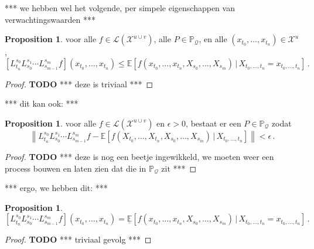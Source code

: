 \documentclass[10pt]{paper}
\theoremstyle{definition}
\newtheorem{proposition}[theorem]{Proposition}
\newcommand{\states}{\mathcal{X}}
\newcommand{\processes}{\mathbb{P}}
\newcommand{\gambles}{\mathcal{L}}
\newcommand{\rateset}{\mathcal{Q}}
\newcommand{\norm}[1]{\left\lVert #1 \right\rVert}
\begin{document}
*** we hebben wel het volgende, per simpele eigenschappen van verwachtingswaarden ***
\begin{proposition}
voor alle $f\in\gambles(\states^{u\cup v})$, alle $P\in\processes_\rateset$, en alle $(x_{t_0},\ldots,x_{t_n})\in\states^u$,
\begin{equation*}
\left[L_{t_n}^{s_0}L_{s_0}^{s_1}\cdots L_{s_{m-1}}^{s_m}f\right](x_{t_0},\ldots,x_{t_n}) \leq \mathbb{E}[f(x_{t_0},\ldots,x_{t_n},X_{s_0},\ldots,X_{s_m})\,\vert\,X_{t_0,\ldots,t_n}=x_{t_0,\ldots,t_n}]\,.
\end{equation*}
\end{proposition}
\begin{proof}
{\bf TODO} *** deze is triviaal ***
\end{proof}

*** dit kan ook: ***
\begin{proposition}
voor alle $f\in\gambles(\states^{u\cup v})$ en $\epsilon>0$, bestaat er een $P\in\processes_\rateset$ zodat
\begin{equation*}
\norm{L_{t_n}^{s_0}L_{s_0}^{s_1}\cdots L_{s_{m-1}}^{s_m}f - \mathbb{E}[f(X_{t_0},\ldots,X_{t_n},X_{s_0},\ldots,X_{s_m})\,\vert\,X_{t_0,\ldots,t_n}]} < \epsilon\,.
\end{equation*}
\end{proposition}
\begin{proof}
{\bf TODO} *** deze is nog een beetje ingewikkeld, we moeten weer een process bouwen en laten zien dat die in $\processes_\rateset$ zit ***
\end{proof}

*** ergo, we hebben dit: ***
\begin{proposition}
\begin{equation*}
\left[L_{t_n}^{s_0}L_{s_0}^{s_1}\cdots L_{s_{m-1}}^{s_m}f\right](x_{t_0},\ldots,x_{t_n}) = \underline{\mathbb{E}}[f(x_{t_0},\ldots,x_{t_n},X_{s_0},\ldots,X_{s_m})\,\vert\,X_{t_0,\ldots,t_n}=x_{t_0,\ldots,t_n}]\,.
\end{equation*}
\end{proposition}
\begin{proof}
{\bf TODO} *** triviaal gevolg ***
\end{proof}
\end{document}
